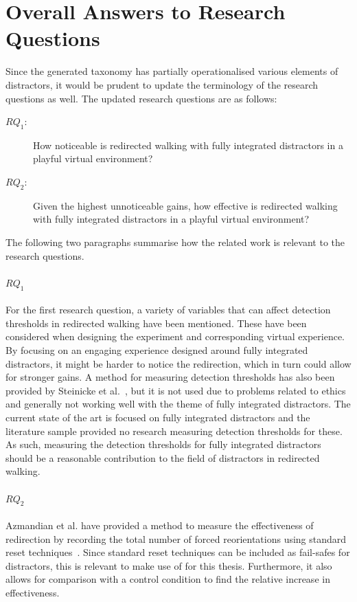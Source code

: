 \section{Overall Answers to Research Questions}
Since the generated taxonomy has partially operationalised various elements of distractors, it would be prudent to update the terminology of the research questions as well. 
The updated research questions are as follows: 
\begin{description}
   \item[$RQ_1$: ] How noticeable is redirected walking with fully integrated distractors in a playful virtual environment?
   \item[$RQ_2$: ] Given the highest unnoticeable gains, how effective is redirected walking with fully integrated distractors in a playful virtual environment?
\end{description}

The following two paragraphs summarise how the related work is relevant to the research questions.

\paragraph{$RQ_1$}
For the first research question, a variety of variables that can affect detection thresholds in redirected walking have been mentioned. These have been considered when designing the experiment and corresponding virtual experience. By focusing on an engaging experience designed around fully integrated distractors, it might be harder to notice the redirection, which in turn could allow for stronger gains. A method for measuring detection thresholds has also been provided by Steinicke et al.~\cite{5072212}, but it is not used due to problems related to ethics and generally not working well with the theme of fully integrated distractors. The current state of the art is focused on fully integrated distractors and the literature sample provided no research measuring detection thresholds for these. As such, measuring the detection thresholds for fully integrated distractors should be a reasonable contribution to the field of distractors in redirected walking.

\paragraph{$RQ_2$}
Azmandian et al. have provided a method to measure the effectiveness of redirection by recording the total number of forced reorientations using standard reset techniques~\cite{azmandian2015physical}. Since standard reset techniques can be included as fail-safes for distractors, this is relevant to make use of for this thesis. Furthermore, it also allows for comparison with a control condition to find the relative increase in effectiveness.

